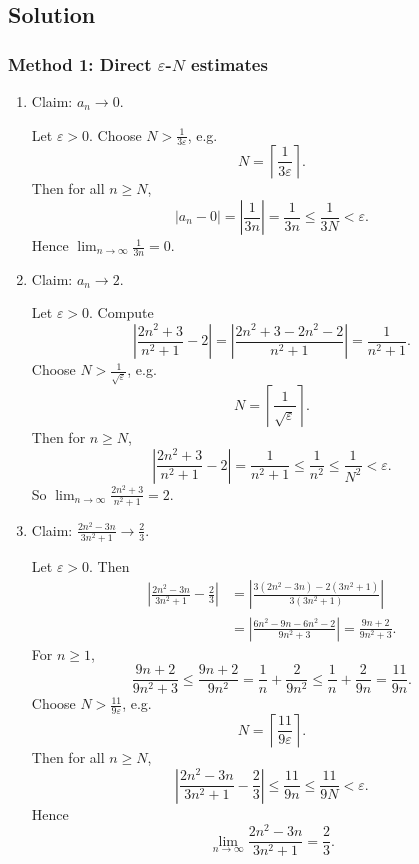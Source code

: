 \documentclass[12pt]{article}
\begin{document}
\subsection*{Solution}

\subsubsection*{Method 1: Direct \(\varepsilon\)-\(N\) estimates}

\begin{enumerate}[label=(\alph*)]
\item Claim: \(a_n\to 0\).

Let \(\varepsilon>0\). Choose \(N>\frac{1}{3\varepsilon}\), e.g.
\[
N=\left\lceil \frac{1}{3\varepsilon}\right\rceil.
\]
Then for all \(n\ge N\),
\[
|a_n-0|=\left|\frac{1}{3n}\right|=\frac{1}{3n}\le \frac{1}{3N}<\varepsilon.
\]
Hence \(\displaystyle \boxed{\lim_{n\to\infty}\frac{1}{3n}=0}\).

\item Claim: \(a_n\to 2\).

Let \(\varepsilon>0\). Compute
\[
\left|\frac{2n^{2}+3}{n^{2}+1}-2\right|
=\left|\frac{2n^{2}+3-2n^{2}-2}{n^{2}+1}\right|
=\frac{1}{n^{2}+1}.
\]
Choose \(N>\frac{1}{\sqrt{\varepsilon}}\), e.g.
\[
N=\left\lceil \frac{1}{\sqrt{\varepsilon}}\right\rceil.
\]
Then for \(n\ge N\),
\[
\left|\frac{2n^{2}+3}{n^{2}+1}-2\right|
=\frac{1}{n^{2}+1}
\le \frac{1}{n^{2}}
\le \frac{1}{N^{2}}
<\varepsilon.
\]
So \(\displaystyle \boxed{\lim_{n\to\infty}\frac{2n^{2}+3}{n^{2}+1}=2}\).

\item Claim: \(\displaystyle \frac{2n^{2}-3n}{3n^{2}+1}\to \frac{2}{3}\).

Let \(\varepsilon>0\). Then
\begin{align*}
\left|\frac{2n^{2}-3n}{3n^{2}+1}-\frac{2}{3}\right|
&=\left|\frac{3(2n^{2}-3n)-2(3n^{2}+1)}{3(3n^{2}+1)}\right|\\
&=\left|\frac{6n^{2}-9n-6n^{2}-2}{9n^{2}+3}\right|
=\frac{9n+2}{9n^{2}+3}.
\end{align*}
For \(n\ge 1\),
\[
\frac{9n+2}{9n^{2}+3}\le \frac{9n+2}{9n^{2}}
=\frac{1}{n}+\frac{2}{9n^{2}}
\le \frac{1}{n}+\frac{2}{9n}
=\frac{11}{9n}.
\]
Choose \(N>\frac{11}{9\varepsilon}\), e.g.
\[
N=\left\lceil \frac{11}{9\varepsilon}\right\rceil.
\]
Then for all \(n\ge N\),
\[
\left|\frac{2n^{2}-3n}{3n^{2}+1}-\frac{2}{3}\right|
\le \frac{11}{9n}\le \frac{11}{9N}<\varepsilon.
\]
Hence
\[
\boxed{\lim_{n\to\infty}\frac{2n^{2}-3n}{3n^{2}+1}=\frac{2}{3}.}
\]
\end{enumerate}
\end{document}
